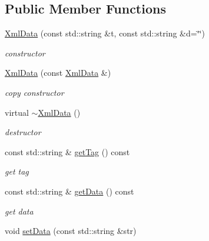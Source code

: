 \subsection*{\-Public \-Member \-Functions}
\begin{DoxyCompactItemize}
\item 
\hyperlink{classsinsy_1_1XmlData_abe69d904133fe8a99ae013a41418ab72}{\-Xml\-Data} (const std\-::string \&t, const std\-::string \&d=\char`\"{}\char`\"{})
\begin{DoxyCompactList}\small\item\em constructor \end{DoxyCompactList}\item 
\hypertarget{classsinsy_1_1XmlData_a4548ecce1cc5b2b26fcb30aba716d42a}{\hyperlink{classsinsy_1_1XmlData_a4548ecce1cc5b2b26fcb30aba716d42a}{\-Xml\-Data} (const \hyperlink{classsinsy_1_1XmlData}{\-Xml\-Data} \&)}\label{classsinsy_1_1XmlData_a4548ecce1cc5b2b26fcb30aba716d42a}

\begin{DoxyCompactList}\small\item\em copy constructor \end{DoxyCompactList}\item 
\hypertarget{classsinsy_1_1XmlData_a847aa0938ae7466fbcface61c883ecd8}{virtual \hyperlink{classsinsy_1_1XmlData_a847aa0938ae7466fbcface61c883ecd8}{$\sim$\-Xml\-Data} ()}\label{classsinsy_1_1XmlData_a847aa0938ae7466fbcface61c883ecd8}

\begin{DoxyCompactList}\small\item\em destructor \end{DoxyCompactList}\item 
\hypertarget{classsinsy_1_1XmlData_aa9dcc99c122404a684e6c333f9e6070a}{const std\-::string \& \hyperlink{classsinsy_1_1XmlData_aa9dcc99c122404a684e6c333f9e6070a}{get\-Tag} () const }\label{classsinsy_1_1XmlData_aa9dcc99c122404a684e6c333f9e6070a}

\begin{DoxyCompactList}\small\item\em get tag \end{DoxyCompactList}\item 
\hypertarget{classsinsy_1_1XmlData_ae3f90a3ad85b374848e1fe0fb427101f}{const std\-::string \& \hyperlink{classsinsy_1_1XmlData_ae3f90a3ad85b374848e1fe0fb427101f}{get\-Data} () const }\label{classsinsy_1_1XmlData_ae3f90a3ad85b374848e1fe0fb427101f}

\begin{DoxyCompactList}\small\item\em get data \end{DoxyCompactList}\item 
\hypertarget{classsinsy_1_1XmlData_a41e71f4fc6991539947a6aed54eec70a}{void \hyperlink{classsinsy_1_1XmlData_a41e71f4fc6991539947a6aed54eec70a}{set\-Data} (const std\-::string \&str)}\label{classsinsy_1_1XmlData_a41e71f4fc6991539947a6aed54eec70a}


\end{DoxyCompactItemize}
